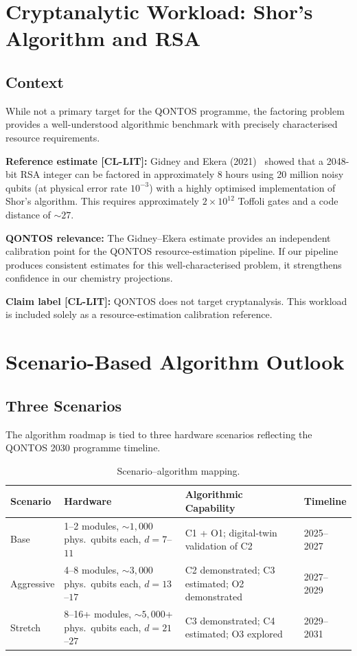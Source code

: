 \documentclass[conference]{IEEEtran}
\begin{document}
\section{Cryptanalytic Workload: Shor's Algorithm and RSA}

\subsection{Context}

While not a primary target for the QONTOS programme, the factoring problem provides a
well-understood algorithmic benchmark with precisely characterised resource
requirements.

\textbf{Reference estimate [CL-LIT]:} Gidney and Ekera (2021)~\cite{gidney2021} showed that a 2048-bit RSA
integer can be factored in approximately 8 hours using 20 million noisy qubits (at
physical error rate $10^{-3}$) with a highly optimised implementation of Shor's
algorithm. This requires approximately $2 \times 10^{12}$ Toffoli gates and a code distance
of ${\sim}27$.

\textbf{QONTOS relevance:} The Gidney--Ekera estimate provides an independent calibration
point for the QONTOS resource-estimation pipeline. If our pipeline produces
consistent estimates for this well-characterised problem, it strengthens confidence
in our chemistry projections.

\textbf{Claim label [CL-LIT]:} QONTOS does not target cryptanalysis. This workload is
included solely as a resource-estimation calibration reference.

\section{Scenario-Based Algorithm Outlook}

\subsection{Three Scenarios}

The algorithm roadmap is tied to three hardware scenarios reflecting the QONTOS 2030
programme timeline.

\begin{table}[H]
\centering
\caption{Scenario--algorithm mapping.}
\label{tab:scenarios}
\begin{tabular}{@{}l L{2.2cm} L{2.5cm} l@{}}
\toprule
\textbf{Scenario} & \textbf{Hardware} & \textbf{Algorithmic Capability} & \textbf{Timeline} \\
\midrule
Base & 1--2 modules, ${\sim}1{,}000$ phys.\ qubits each, $d{=}7$--$11$ & C1 + O1; digital-twin validation of C2 & 2025--2027 \\
Aggressive & 4--8 modules, ${\sim}3{,}000$ phys.\ qubits each, $d{=}13$--$17$ & C2 demonstrated; C3 estimated; O2 demonstrated & 2027--2029 \\
Stretch & 8--16+ modules, ${\sim}5{,}000$+ phys.\ qubits each, $d{=}21$--$27$ & C3 demonstrated; C4 estimated; O3 explored & 2029--2031 \\
\bottomrule
\end{tabular}
\end{table}
\end{document}
